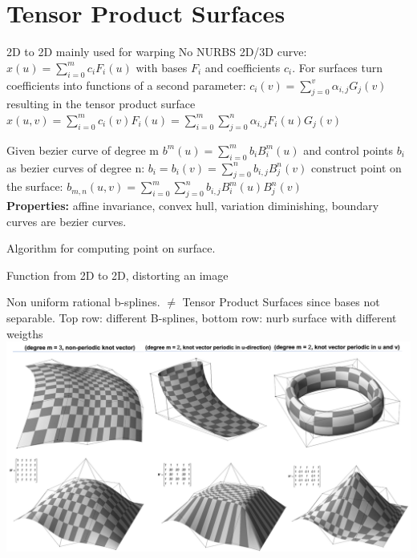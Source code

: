 \section{Tensor Product Surfaces}
2D to 2D mainly used for warping
No NURBS
 2D/3D curve: $x(u) = \sum_{i=0}^mc_iF_i(u)$ with bases $F_i$ and coefficients $c_i$. For surfaces turn coefficients into functions of a second parameter: $c_i(v) = \sum_{j=0}^v\alpha_{i,j}G_j(v)$ resulting in the tensor product surface $x(u,v) = \sum_{i=0}^mc_i(v)F_i(u) = \sum_{i=0}^m\sum_{j=0}^n\alpha_{i,j}F_i(u)G_j(v)$

 Given bezier curve of degree m $b^m(u) = \sum_{i=0}^mb_iB_i^m(u)$ and control points $b_i$ as bezier curves of degree n: $b_i = b_i(v) = \sum_{j=0}^nb_{i,j}B_j^n(v)$ construct point on the surface: $b_{m,n}(u,v) = \sum_{i=0}^m\sum_{j=0}^nb_{i,j}B_i^m(u)B_j^n(v)$\\
\textbf{Properties:} affine invariance, convex hull, variation diminishing, boundary curves are bezier curves.

 Algorithm for computing point on surface.

 Function from 2D to 2D, distorting an image

 Non uniform rational b-splines. $\neq$  Tensor Product Surfaces since bases not separable. Top row: different B-splines, bottom row: nurb surface with different weigths
\includegraphics[width=\columnwidth]{assets/alex/bSplineSurfaces.png}